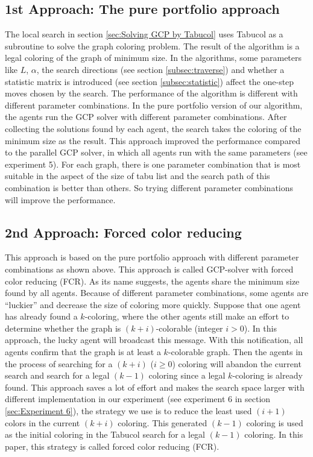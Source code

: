 \documentclass[12pt,a4paper,twoside]{scrartcl}
\numberwithin{equation}{section}
\begin{document}
\subsection{1st Approach: The pure portfolio approach}
The local search in section \ref{sec:Solving GCP by Tabucol} uses Tabucol as a subroutine to solve the graph coloring problem. The result of the algorithm is a legal coloring of the graph of minimum size. In the algorithms, some parameters like $L$, $\alpha$, the search directions (see section  \ref{subsec:traverse}) and whether a statistic matrix is introduced (see section \ref{subsec:statistic}) affect the one-step moves chosen by the search. The performance of the algorithm is different with different parameter combinations. In the pure portfolio version of our algorithm, the agents run the GCP solver with different parameter combinations. After collecting the solutions found by each agent, the search takes the coloring of the minimum size as the result.
This approach improved the performance compared to the parallel GCP solver, in which all agents run with the same parameters (see experiment 5). For each graph, there is one parameter combination that is most suitable in the  aspect of the size of tabu list and the search path of this combination is better than others. So trying different parameter combinations will improve the performance.

\subsection{2nd Approach: Forced color reducing}
This approach is based on the pure portfolio approach with different parameter combinations as shown above. 
This approach  is called GCP-solver with forced color reducing (FCR). As its name suggests, the agents share the minimum size found by all agents. Because of different parameter combinations, some agents are ``luckier'' and decrease the size of coloring more quickly. Suppose that one agent has already found a $k$-coloring, where the other agents still make an effort to determine whether the graph is $(k+i)$-colorable (integer $i > 0$). In this approach, the lucky agent will broadcast this message. With this notification, all agents confirm that the graph is at least a $k$-colorable graph. Then the agents in the process of searching for a $(k + i)$ ($i \geq 0$) coloring will abandon the current search and search for a legal $(k-1)$ coloring since a legal $k$-coloring is already found. This approach saves a lot of  effort and makes the search space larger with different implementation in our experiment (see experiment 6 in section \ref{sec:Experiment 6}), the strategy we use is to reduce the least used $(i+1)$ colors in the current $(k + i)$ coloring. This generated $(k - 1)$ coloring is used as the initial coloring in the Tabucol search for a legal $(k - 1)$ coloring. In this paper, this strategy is called  forced color reducing (FCR).
\end{document}
